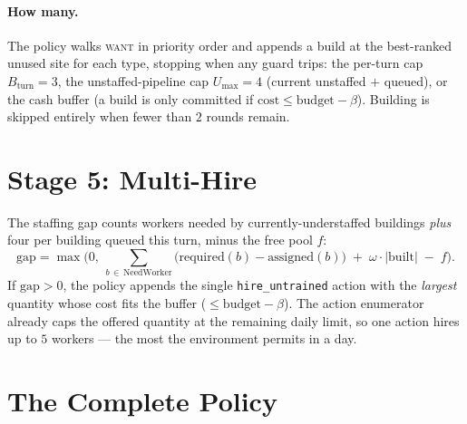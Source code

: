\documentclass[11pt]{article}
\newcommand{\unity}[1]{{\color{unityblue}\texttt{\small #1}}}
\begin{document}
\paragraph{How many.} The policy walks \textsc{want} in priority order and appends a build at the
best-ranked unused site for each type, stopping when any guard trips: the per-turn cap
$B_{\text{turn}}=3$, the unstaffed-pipeline cap $U_{\max}=4$ (current unstaffed $+$ queued), or the
cash buffer (a build is only committed if $\mathrm{cost} \le \text{budget} - \beta$). Building is
skipped entirely when fewer than $2$ rounds remain.

\section{Stage 5: Multi-Hire}
\label{sec:hire}

The staffing gap counts workers needed by currently-understaffed buildings \emph{plus} four per
building queued this turn, minus the free pool $f$:
\begin{equation}
\text{gap} = \max\!\Big(0,\ \textstyle\sum_{b\,\in\,\text{NeedWorker}}\!\big(\text{required}(b)-\text{assigned}(b)\big) \;+\; \omega\cdot|\text{built}| \;-\; f\Big).
\end{equation}
If $\text{gap}>0$, the policy appends the single \unity{hire\_untrained} action with the
\emph{largest} quantity whose cost fits the buffer ($\le \text{budget}-\beta$). The action
enumerator already caps the offered quantity at the remaining daily limit, so one action hires up
to $5$ workers --- the most the environment permits in a day.

\section{The Complete Policy}
\end{document}
